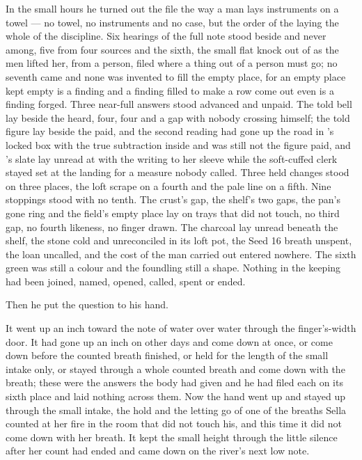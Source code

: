 In the small hours he turned out the file the way a man lays instruments on a towel --- no towel, no instruments and no case, but the order of the laying the whole of the discipline. Six hearings of the full note stood beside and never among, five from four sources and the sixth, the small flat knock out of  as the men lifted her, from a person, filed where a thing out of a person must go; no seventh came and none was invented to fill the empty place, for an empty place kept empty is a finding and a finding filled to make a row come out even is a finding forged. Three near-full answers stood advanced and unpaid. The told bell lay beside the heard, four, four and a gap with nobody crossing himself; the told figure lay beside the paid, and the second reading had gone up the road in 's locked box with the true subtraction inside and was still not the figure paid, and 's slate lay unread at  with the writing to her sleeve while the soft-cuffed clerk stayed set at the landing for a measure nobody called. Three held changes stood on three places, the loft scrape on a fourth and the pale line on a fifth. Nine stoppings stood with no tenth. The crust's gap, the shelf's two gaps, the pan's gone ring and the field's empty place lay on trays that did not touch, no third gap, no fourth likeness, no finger drawn. The charcoal lay unread beneath the shelf, the stone cold and unreconciled in its loft pot, the Seed 16 breath unspent, the loan uncalled, and the cost of the man carried out entered nowhere. The sixth green was still a colour and the foundling still a shape. Nothing in the keeping had been joined, named, opened, called, spent or ended.

Then he put the question to his hand.

It went up an inch toward the note of water over water through the finger's-width door. It had gone up an inch on other days and come down at once, or come down before the counted breath finished, or held for the length of the small intake only, or stayed through a whole counted breath and come down with the breath; these were the answers the body had given and he had filed each on its sixth place and laid nothing across them. Now the hand went up and stayed up through the small intake, the hold and the letting go of one of the breaths Sella counted at her fire in the room that did not touch his, and this time it did not come down with her breath. It kept the small height through the little silence after her count had ended and came down on the river's next low note.


